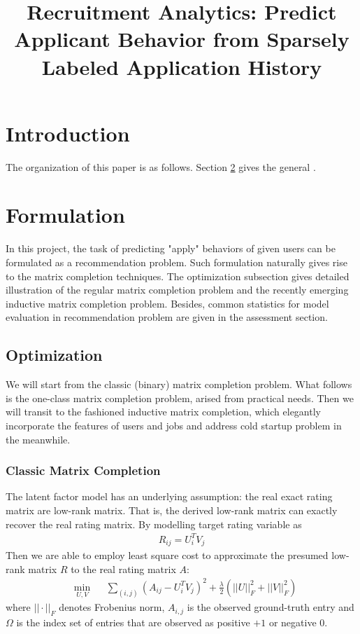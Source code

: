\documentclass{article} %
\title{Recruitment Analytics: Predict Applicant Behavior from Sparsely Labeled Application History}
\author{
}
\begin{document}
\maketitle

\section{Introduction}
The organization of this paper is as follows. Section
\ref{section:formulation} gives the general .


\section{Formulation} \label{section:formulation}
In this project, the task of predicting "apply" behaviors of given users can
be formulated as a recommendation problem. Such formulation naturally
gives rise to the matrix completion techniques. The optimization subsection
gives detailed illustration of the regular matrix completion problem and the
recently emerging inductive matrix completion problem. Besides, common
statistics for model evaluation in recommendation problem are given in the
assessment section. 

\subsection{Optimization}
We will start from the classic (binary) matrix completion problem. What
follows is the one-class matrix completion problem, arised from practical
needs. Then we will transit to the fashioned inductive matrix completion,
which elegantly incorporate the features of users and jobs and address cold
startup problem in the meanwhile. 

\subsubsection{Classic Matrix Completion}
The latent factor model has an underlying assumption: the real exact rating matrix are
low-rank matrix. That is, the derived low-rank matrix can exactly recover the
real rating matrix. By modelling target rating variable as 
\begin{align}
    R_{ij} = U_i^T V_j 
\end{align}
Then we are able to employ least square cost to approximate the presumed low-rank
matrix $R$ to the real rating matrix $A$: 
\begin{equation}
    \begin{aligned}
        &\min_{U,V} 
        && \sum_{(i,j)} (A_{ij} - U_i^T V_j)^2
        + \frac{\lambda}{2}(||U||_F^2 + ||V||_F^2)
    \end{aligned}
\end{equation}
where $|| \cdot ||_F$ denotes Frobenius norm, $A_{i,j}$ is the observed
ground-truth entry and $\Omega$ is the index set of entries that are observed
as positive $+1$ or negative $0$. 
\end{document}
